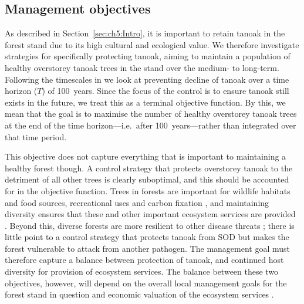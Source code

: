 \newpage
\subsection{Management objectives}\label{sec:ch6:mgmt_objs}

As described in Section~\ref{sec:ch5:Intro}, it is important to retain tanoak in the forest stand due to its high cultural and ecological value. We therefore investigate strategies for specifically protecting tanoak, aiming to maintain a population of healthy overstorey tanoak trees in the stand over the medium- to long-term. Following the timescales in \citet{cobb_ecosystem_2012} we look at preventing decline of tanoak over a time horizon ($T$) of 100~years. Since the focus of the control is to ensure tanoak still exists in the future, we treat this as a terminal objective function. By this, we mean that the goal is to maximise the number of healthy overstorey tanoak trees at the end of the time horizon---i.e.\ after 100~years---rather than integrated over that time period.

This objective does not capture everything that is important to maintaining a healthy forest though. A control strategy that protects overstorey tanoak to the detriment of all other trees is clearly suboptimal, and this should be accounted for in the objective function. Trees in forests are important for wildlife habitats and food sources, recreational uses and carbon fixation \citep{swiecki_reference_2013}, and maintaining diversity ensures that these and other important ecosystem services are provided \citep{cadotte_beyond_2011, gamfeldt_higher_2013}. Beyond this, diverse forests are more resilient to other disease threats \citep{keesing_impacts_2010}; there is little point to a control strategy that protects tanoak from SOD but makes the forest vulnerable to attack from another pathogen. The management goal must therefore capture a balance between protection of tanoak, and continued host diversity for provision of ecosystem services. The balance between these two objectives, however, will depend on the overall local management goals for the forest stand in question and economic valuation of the ecosystem services \citep{thompson_forest_2011}.

